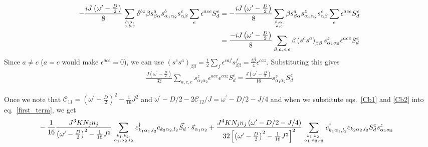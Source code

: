 \documentclass{revtex4-2}
\numberwithin{equation}{section}
\begin{document}
\begin{equation}\begin{aligned}
	- \frac{i J\left(\omega^\prime - \frac{D}{2}\right)}{8}\sum_{\beta,\alpha, \atop{a,b,c}} \delta^{bz}\beta s^a_{\beta \alpha} s^b_{\alpha_1 \alpha_2}s^c_{\alpha \beta}\sum_{e}\epsilon^{ace}S_d^e &= - \frac{i J\left(\omega^\prime - \frac{D}{2}\right)}{8}\sum_{\beta,\alpha, \atop{a,c}} \beta s^a_{\beta \alpha} s^z_{\alpha_1 \alpha_2}s^c_{\alpha \beta}\sum_{e}\epsilon^{ace}S_d^e\\
																									   &=\frac{-iJ\left(\omega^\prime - \frac{D}{2}\right)}{8}\sum_{\beta,a,c,e} \beta \left(s^c s^a\right)_{\beta \beta} s^z_{\alpha_1 \alpha_2}\epsilon^{ace}S_d^e\\
\end{aligned}\end{equation}
Since \(a \neq c\) (\(a=c\) would make \(\epsilon^{ace} = 0\)), we can use \(\left(s^c s^a\right)_{\beta \beta} = \frac{i}{2}\sum_f \epsilon^{caf}s^f_{\beta\beta} = \frac{i\beta}{4}\epsilon^{caz}\). Substituting this gives
\begin{equation}\begin{aligned}
	\label{Cb2}
	\frac{J\left(\omega^\prime - \frac{D}{2}\right)}{32}\sum_{a,c,e} s^z_{\alpha_1 \alpha_2}\epsilon^{ace}\epsilon^{caz}S_d^e = \frac{J\left(\omega^\prime - \frac{D}{2}\right)}{16} s^z_{\alpha_1 \alpha_2}S_d^z
\end{aligned}\end{equation}

Once we note that \(\mathcal{C}_{11} = \left(\omega^\prime - \frac{D}{2}\right)^2 - \frac{1}{16}J^2\) and \(\omega^\prime - D/2 - 2\mathcal{C}_{12}/J = \omega^\prime - D/2 - J/4\) and when we substitute eqs.~\ref{Cb1} and \ref{Cb2} into eq.~\ref{first_term}, we get
\begin{equation}\begin{aligned}
	\label{third_term_1}
	&-\frac{1}{16}\frac{J^3 K N_j n_j }{\left(\omega^\prime - \frac{D}{2}\right)^2 - \frac{1}{16}J^2}\sum_{k_1,k_2,\atop{\alpha_1,\alpha_2,l_2}}c^\dagger_{k_1\alpha_1,l_2}c_{k_2 \alpha_2,l_2} \vec{S_d}\cdot\vec{s}_{\alpha_1\alpha_2} + \frac{J^4 K N_j n_j \left( \omega^\prime - D/2 - J/4 \right) }{32\left[\left(\omega^\prime - \frac{D}{2}\right)^2 - \frac{1}{16}J^2\right]^2}\sum_{k_1,k_2,\atop{\alpha_1,\alpha_2,l_2}} c^\dagger_{k_1 \alpha_1,l_2}c_{k_2 \alpha_2,l_2}S_d^z s^z_{\alpha_1\alpha_2}
\end{aligned}\end{equation}
\end{document}
